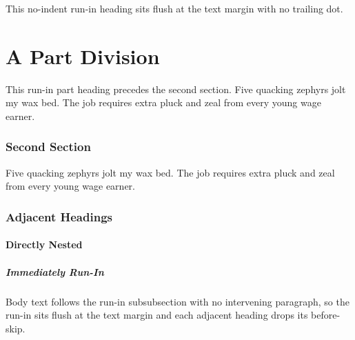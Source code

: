 \documentclass[acmsmall,nonacm]{acmart}
\begin{document}
This no-indent run-in heading sits flush at the text margin with no trailing dot.

\part{A Part Division}
This run-in part heading precedes the second section. Five quacking zephyrs jolt
my wax bed. The job requires extra pluck and zeal from every young wage earner.

\section{Second Section}
Five quacking zephyrs jolt my wax bed. The job requires extra pluck and zeal
from every young wage earner.

\section{Adjacent Headings}
\subsection{Directly Nested}
\subsubsection{Immediately Run-In}
Body text follows the run-in subsubsection with no intervening paragraph, so
the run-in sits flush at the text margin and each adjacent heading drops its
before-skip.
\end{document}
